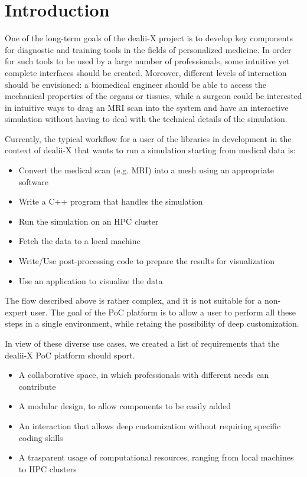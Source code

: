 \documentclass[a4paper,12pt]{article}
\begin{document}
\vspace*{2cm}

\disclaimer

\newpage

\tableofcontents %

\newpage


\section{\textcolor{EUblue}{Introduction}}

One of the long-term goals of the dealii-X project is to develop key components for diagnostic and training tools in the fields of personalized medicine. In order for such tools to be used by a large number of professionals, some intuitive yet complete interfaces should be created. Moreover, different levels of interaction should be envisioned: a biomedical engineer should be able to access the mechanical properties of the organs or tissues, while a surgeon could be interested in intuitive ways to drag an MRI scan into the system and have an interactive simulation without having to deal with the technical details of the simulation.

Currently, the typical workflow for a user of the libraries in development in the context of dealii-X that wants to run a simulation starting from medical data is:
\begin{itemize}
    \item Convert the medical scan (e.g. MRI) into a mesh using an appropriate software  
    \item Write a C++ program that handles the simulation
    \item Run the simulation on an HPC cluster
    \item Fetch the data to a local machine
    \item Write/Use post-processing code to prepare the results for visualization
    \item Use an application to visualize the data
\end{itemize} 
The flow described above is rather complex, and it is not suitable for a non-expert user. The goal of the PoC platform is to allow a user to perform all these steps in a single environment, while retaing the possibility of deep customization.

In view of these diverse use cases, we created a list of requirements that the dealii-X PoC platform should sport.
\begin{itemize}
    \item A collaborative space, in which professionals with different needs can contribute
    \item A modular design, to allow components to be easily added
    \item An interaction that allows deep customization without requiring specific coding skills
    \item A trasparent usage of computational resources, ranging from local machines to HPC clusters
\end{itemize}
\end{document}
